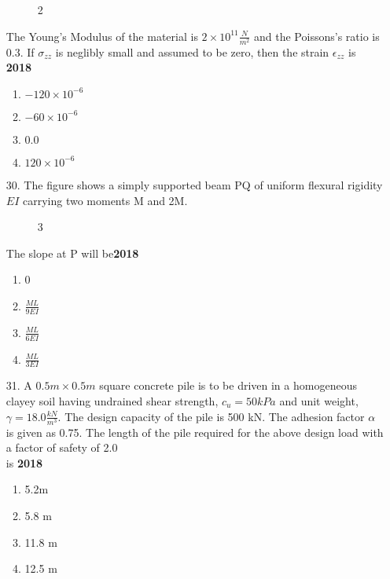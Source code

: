 \documentclass[journal]{IEEEtran}
\begin{document}
\begin{enumerate}
    \begin{figure}[!ht]
        \centering
        \caption{2}
    \end{figure}
    The Young's Modulus of the material is $2\times 10^{11}\frac{N}{m^2}$ and the Poissons's ratio is 0.3. If $\sigma_{zz}$ is neglibly small and assumed to be zero, then the strain $\epsilon_{zz}$ is \hfill \textbf{2018}
    \begin{enumerate}[label=(\Alph*)]
        \item $-120\times 10^{-6}$
        \item $-60\times 10^{-6}$
        \item $0.0$
        \item $120\times 10^{-6}$
    \end{enumerate}
    \item[30.] The figure shows a simply supported beam PQ of uniform flexural rigidity $EI$ carrying two
    moments M and 2M. 
    \begin{figure}[!ht]
        \centering
        \caption{3}
    \end{figure}
    The slope at P will be\hfill \textbf{2018}
    \begin{enumerate}[label= (\Alph*)]
        \item 0
        \item $\frac{ML}{9EI}$
        \item $\frac{ML}{6EI}$
        \item $\frac{ML}{3EI}$
    \end{enumerate}
    \item[31.] A $0.5 m \times 0.5 m$ square concrete pile is to be driven in a homogeneous clayey soil having
    undrained shear strength, $c_u = 50 kPa$ and unit weight, $\gamma = 18.0 \frac{kN}{m^3}$. The design capacity
    of the pile is 500 kN. The adhesion factor $\alpha$ is given as 0.75. The length of the pile required
    for the above design load with a factor of safety of 2.0\\ is \hfill \textbf{2018}
    \begin{enumerate}[label = (\Alph*)]
        \item 5.2m 
        \item 5.8 m 
        \item 11.8 m
        \item 12.5 m 
    \end{enumerate}

\end{enumerate}
\end{document}
